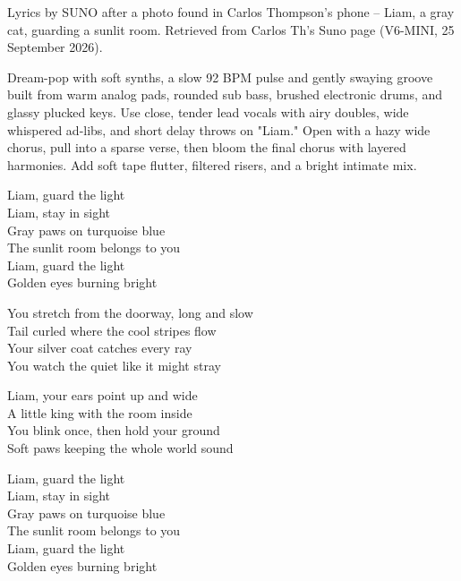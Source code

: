 
\begin{notes}
Lyrics by SUNO after a photo found in Carlos Thompson's phone -- Liam, a gray cat, guarding a sunlit room. Retrieved from Carlos Th's Suno page (V6-MINI, 25 September 2026).
\end{notes}
\begin{style}
Dream-pop with soft synths, a slow 92 BPM pulse and gently swaying groove built from warm analog pads, rounded sub bass, brushed electronic drums, and glassy plucked keys. Use close, tender lead vocals with airy doubles, wide whispered ad-libs, and short delay throws on "Liam." Open with a hazy wide chorus, pull into a sparse verse, then bloom the final chorus with layered harmonies. Add soft tape flutter, filtered risers, and a bright intimate mix.
\end{style}
\begin{lyrics}
Liam, guard the light\\
Liam, stay in sight\\
Gray paws on turquoise blue\\
The sunlit room belongs to you\\
Liam, guard the light\\
Golden eyes burning bright

You stretch from the doorway, long and slow\\
Tail curled where the cool stripes flow\\
Your silver coat catches every ray\\
You watch the quiet like it might stray

Liam, your ears point up and wide\\
A little king with the room inside\\
You blink once, then hold your ground\\
Soft paws keeping the whole world sound

Liam, guard the light\\
Liam, stay in sight\\
Gray paws on turquoise blue\\
The sunlit room belongs to you\\
Liam, guard the light\\
Golden eyes burning bright
\end{lyrics}

